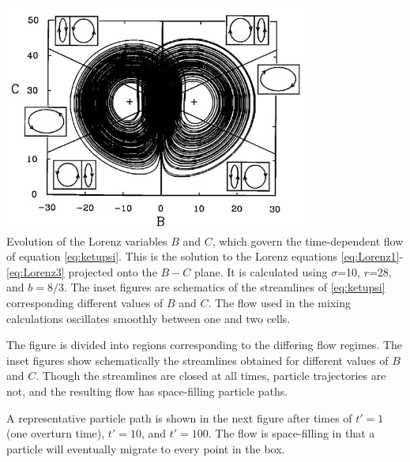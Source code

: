 \begin{center}
\includegraphics[width=10cm]{python_codes/fieldstone_156/images/ketu90a}\\
{\captionfont Evolution of the Lorenz variables $B$ and $C$,
which govern the time-dependent flow of equation \eqref{eq:ketupsi}.
This is the solution to the Lorenz equations
\eqref{eq:Lorenz1}-\eqref{eq:Lorenz3} projected onto the $B-C$ plane. It is calculated
using  $\sigma$=10, $r$=28, and $b = 8/3$. The inset figures are
schematics of the streamlines of \eqref{eq:ketupsi} corresponding
different values of $B$ and $C$. The flow used in the mixing 
calculations oscillates smoothly between one and two cells.}
\end{center}

The figure is divided into regions corresponding
to the differing flow regimes. The inset figures
show schematically the streamlines obtained for
different values of $B$ and $C$. Though the streamlines
are closed at all times, particle trajectories are not, and
the resulting flow has space-filling particle paths.

A representative particle path is shown in the next figure
after times of $t'=1$ (one overturn time), $t'=10$, and $t'=100$.
The flow is space-filling in that a particle will eventually
migrate to every point in the box. 


